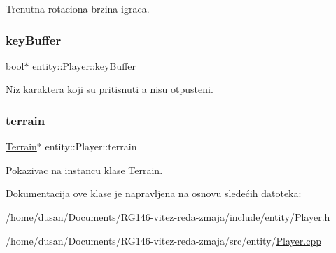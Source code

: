 Trenutna rotaciona brzina igraca. 

\mbox{\label{classentity_1_1Player_ad36623cb0c52ae4dc97d73cbf1cd2134}} 
\subsubsection{\texorpdfstring{key\+Buffer}{keyBuffer}}
{\footnotesize\ttfamily bool$\ast$ entity\+::\+Player\+::key\+Buffer\hspace{0.3cm}{\ttfamily [private]}}



Niz karaktera koji su pritisnuti a nisu otpusteni. 

\mbox{\label{classentity_1_1Player_adc298ca7a3d8ab3528440489ed4ea60e}} 
\subsubsection{\texorpdfstring{terrain}{terrain}}
{\footnotesize\ttfamily \hyperlink{classterrain_1_1Terrain}{Terrain}$\ast$ entity\+::\+Player\+::terrain\hspace{0.3cm}{\ttfamily [private]}}



Pokazivac na instancu klase Terrain. 



Dokumentacija ove klase je napravljena na osnovu sledećih datoteka\+:\begin{DoxyCompactItemize}
\item 
/home/dusan/\+Documents/\+R\+G146-\/vitez-\/reda-\/zmaja/include/entity/\hyperlink{Player_8h}{Player.\+h}\item 
/home/dusan/\+Documents/\+R\+G146-\/vitez-\/reda-\/zmaja/src/entity/\hyperlink{Player_8cpp}{Player.\+cpp}\end{DoxyCompactItemize}
